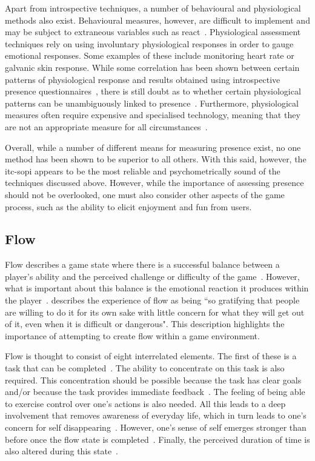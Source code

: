 Apart from introspective techniques, a number of behavioural and physiological methods also exist. Behavioural measures, however, are difficult to implement and may be subject to extraneous variables such as \gls{react}~\citep{Blak10}. Physiological assessment techniques rely on using involuntary physiological responses in order to gauge emotional responses. Some examples of these include monitoring heart rate or galvanic skin response. While some correlation has been shown between certain patterns of physiological response and results obtained using introspective presence questionnaires~\citep{Rava04}, there is still doubt as to whether certain physiological patterns can be unambiguously linked to presence~\citep{Blak10}. Furthermore, physiological measures often require expensive and specialised technology, meaning that they are not an appropriate measure for all circumstances~\citep{Blak10}.

Overall, while a number of different means for measuring presence exist, no one method has been shown to be superior to all others. With this said, however, the \gls{itc-sopi} appears to be the most reliable and psychometrically sound of the techniques discussed above. However, while the importance of assessing presence should not be overlooked, one must also consider other aspects of the game process, such as the ability to elicit enjoyment and fun from users.

\subsection{Flow}
Flow describes a game state where there is a successful balance between a player's ability and the perceived challenge or difficulty of the game~\citep{Ermi05}. However, what is important about this balance is the emotional reaction it produces within the player~\citep{John03}. \citet{Csik90} describes the experience of flow as being ``so gratifying that people are willing to do it for its own sake with little concern for what they will get out of it, even when it is difficult or dangerous". This description highlights the importance of attempting to create flow within a game environment.

Flow is thought to consist of eight interrelated elements. The first of these is a task that can be completed~\citep{Swee05}. The ability to concentrate on this task is also required. This concentration should be possible because the task has clear goals and/or because the task provides immediate feedback~\citep{John03}. The feeling of being able to exercise control over one's actions is also needed. All this leads to a deep involvement that removes awareness of everyday life, which in turn leads to one's concern for self disappearing~\citep{Swee05}. However, one's sense of self emerges stronger than before once the flow state is completed~\citep{Swee05}. Finally, the perceived duration of time is also altered during this state~\citep{John03}.

